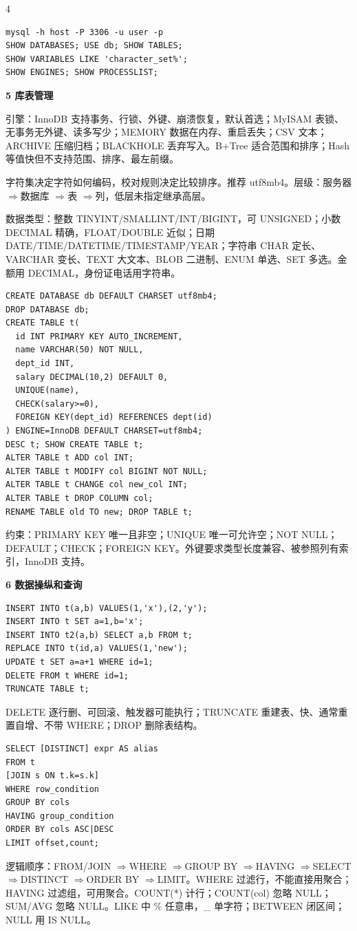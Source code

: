 \documentclass[UTF8]{ctexart}
\newcommand{\blk}[1]{\vspace{0.8pt}\noindent\colorbox{black!10}{\parbox{\dimexpr\linewidth-2\fboxsep}{\bfseries #1}}\vspace{0.6pt}}
\newcommand{\tri}{$\Rightarrow$}
\begin{document}
\begin{multicols*}{4}
\begin{lstlisting}
mysql -h host -P 3306 -u user -p
SHOW DATABASES; USE db; SHOW TABLES;
SHOW VARIABLES LIKE 'character_set%';
SHOW ENGINES; SHOW PROCESSLIST;
\end{lstlisting}

\blk{5 库表管理}
引擎：InnoDB 支持事务、行锁、外键、崩溃恢复，默认首选；MyISAM 表锁、无事务无外键、读多写少；MEMORY 数据在内存、重启丢失；CSV 文本；ARCHIVE 压缩归档；BLACKHOLE 丢弃写入。B+Tree 适合范围和排序；Hash 等值快但不支持范围、排序、最左前缀。

字符集决定字符如何编码，校对规则决定比较排序。推荐 utf8mb4。层级：服务器 \tri 数据库 \tri 表 \tri 列，低层未指定继承高层。

数据类型：整数 TINYINT/SMALLINT/INT/BIGINT，可 UNSIGNED；小数 DECIMAL 精确，FLOAT/DOUBLE 近似；日期 DATE/TIME/DATETIME/TIMESTAMP/YEAR；字符串 CHAR 定长、VARCHAR 变长、TEXT 大文本、BLOB 二进制、ENUM 单选、SET 多选。金额用 DECIMAL，身份证电话用字符串。

\begin{lstlisting}
CREATE DATABASE db DEFAULT CHARSET utf8mb4;
DROP DATABASE db;
CREATE TABLE t(
  id INT PRIMARY KEY AUTO_INCREMENT,
  name VARCHAR(50) NOT NULL,
  dept_id INT,
  salary DECIMAL(10,2) DEFAULT 0,
  UNIQUE(name),
  CHECK(salary>=0),
  FOREIGN KEY(dept_id) REFERENCES dept(id)
) ENGINE=InnoDB DEFAULT CHARSET=utf8mb4;
DESC t; SHOW CREATE TABLE t;
ALTER TABLE t ADD col INT;
ALTER TABLE t MODIFY col BIGINT NOT NULL;
ALTER TABLE t CHANGE col new_col INT;
ALTER TABLE t DROP COLUMN col;
RENAME TABLE old TO new; DROP TABLE t;
\end{lstlisting}

约束：PRIMARY KEY 唯一且非空；UNIQUE 唯一可允许空；NOT NULL；DEFAULT；CHECK；FOREIGN KEY。外键要求类型长度兼容、被参照列有索引，InnoDB 支持。

\blk{6 数据操纵和查询}
\begin{lstlisting}
INSERT INTO t(a,b) VALUES(1,'x'),(2,'y');
INSERT INTO t SET a=1,b='x';
INSERT INTO t2(a,b) SELECT a,b FROM t;
REPLACE INTO t(id,a) VALUES(1,'new');
UPDATE t SET a=a+1 WHERE id=1;
DELETE FROM t WHERE id=1;
TRUNCATE TABLE t;
\end{lstlisting}
DELETE 逐行删、可回滚、触发器可能执行；TRUNCATE 重建表、快、通常重置自增、不带 WHERE；DROP 删除表结构。

\begin{lstlisting}
SELECT [DISTINCT] expr AS alias
FROM t
[JOIN s ON t.k=s.k]
WHERE row_condition
GROUP BY cols
HAVING group_condition
ORDER BY cols ASC|DESC
LIMIT offset,count;
\end{lstlisting}
逻辑顺序：FROM/JOIN \tri WHERE \tri GROUP BY \tri HAVING \tri SELECT \tri DISTINCT \tri ORDER BY \tri LIMIT。WHERE 过滤行，不能直接用聚合；HAVING 过滤组，可用聚合。COUNT(*) 计行；COUNT(col) 忽略 NULL；SUM/AVG 忽略 NULL。LIKE 中 \% 任意串，\_ 单字符；BETWEEN 闭区间；NULL 用 IS NULL。


\end{multicols*}
\end{document}
